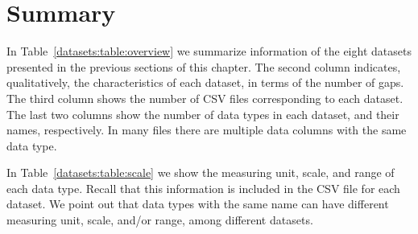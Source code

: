 
\vspace{-15pt}
\section{Summary}
\label{datasets:summary}


\vspace{-5pt}
In Table~\ref{datasets:table:overview} we summarize information of the eight datasets presented in the previous sections of this chapter. The second column indicates, qualitatively, the characteristics of each dataset, in terms of the number of gaps. The third column shows the number of CSV files corresponding to each dataset. The last two columns show the number of data types in each dataset, and their names, respectively. In many files there are multiple data columns with the same data type.





\clearpage


In Table~\ref{datasets:table:scale} we show the measuring unit, scale, and range of each data type. Recall that this information is included in the CSV file for each dataset.  We point out that data types with the same name can have different measuring unit, scale, and/or range, among different datasets. 

\vspace{+5pt}


